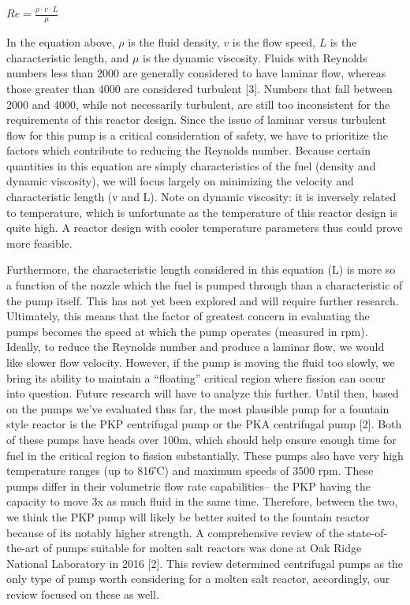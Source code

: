 \documentclass[11pt]{article}
\begin{document}
$Re = \frac{\rho \cdot v \cdot L}{\mu}$

In the equation above, $\rho$ is the fluid density, $ v $ is the flow speed, $L$ is the characteristic length, and $\mu$ is the dynamic viscosity. Fluids with Reynolds numbers less than 2000 are generally considered to have laminar flow, whereas those greater than 4000 are considered turbulent [3]. Numbers that fall between 2000 and 4000, while not necessarily turbulent, are still too inconsistent for the requirements of this reactor design. Since the issue of laminar versus turbulent flow for this pump is a critical consideration of safety, we have to prioritize the factors which contribute to reducing the Reynolds number. Because certain quantities in this equation are simply characteristics of the fuel (density and dynamic viscosity), we will focus largely on minimizing the velocity and characteristic length (v and L). Note on dynamic viscosity: it is inversely related to temperature, which is unfortunate as the temperature of this reactor design is quite high. A reactor design with cooler temperature parameters thus could prove more feasible.

Furthermore, the characteristic length considered in this equation (L) is more so a function of the nozzle which the fuel is pumped through than a characteristic of the pump itself. This has not yet been explored and will require further research. Ultimately, this means that the factor of greatest concern in evaluating the pumps becomes the speed at which the pump operates (measured in rpm). Ideally, to reduce the Reynolds number and produce a laminar flow, we would like slower flow velocity. However, if the pump is moving the fluid too slowly, we bring its ability to maintain a “floating” critical region where fission can occur into question. Future research will have to analyze this further. Until then, based on the pumps we’ve evaluated thus far, the most plausible pump for a fountain style reactor is the PKP centrifugal pump or the PKA centrifugal pump [2]. Both of these pumps have heads over 100m, which should help ensure enough time for fuel in the critical region to fission substantially. These pumps also have very high temperature ranges (up to 816℃) and maximum speeds of 3500 rpm. These pumps differ in their volumetric flow rate capabilities-- the PKP having the capacity to move 3x as much fluid in the same time. Therefore, between the two, we think the PKP pump will likely be better suited to the fountain reactor because of its notably higher strength. A comprehensive review of the state-of-the-art of pumps suitable for molten salt reactors was done at Oak Ridge National Laboratory in 2016 [2]. This review determined centrifugal pumps as the only type of pump worth considering for a molten salt reactor, accordingly, our review focused on these as well.
\end{document}
